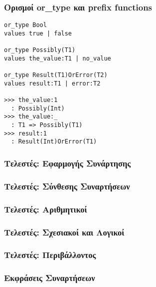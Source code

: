 \documentclass{beamer}
\def\e{\foreignlanguage{english}}
\begin{document}
\begin{frame}[fragile]

\frametitle{Ορισμοί \e{or\_type} και \e{prefix functions}}


\begin{otherlanguage}{english}
\begin{verbatim}
or_type Bool
values true | false

or_type Possibly(T1)
values the_value:T1 | no_value

or_type Result(T1)OrError(T2)
values result:T1 | error:T2

>>> the_value:1
  : Possibly(Int)
>>> the_value:_
  : T1 => Possibly(T1)
>>> result:1
  : Result(Int)OrError(T1)

\end{verbatim}
\end{otherlanguage}

\end{frame}

\begin{frame}

\frametitle{Τελεστές: Εφαρμογής Συνάρτησης}

\end{frame}

\begin{frame}

\frametitle{Τελεστές: Σύνθεσης Συναρτήσεων}

\end{frame}

\begin{frame}

\frametitle{Τελεστές: Αριθμητικοί}

\end{frame}

\begin{frame}

\frametitle{Τελεστές: Σχεσιακοί και Λογικοί}

\end{frame}

\begin{frame}

\frametitle{Τελεστές: Περιβάλλοντος}

\end{frame}

\begin{frame}

\frametitle{Εκφράσεις Συναρτήσεων}

\end{frame}
\end{document}
